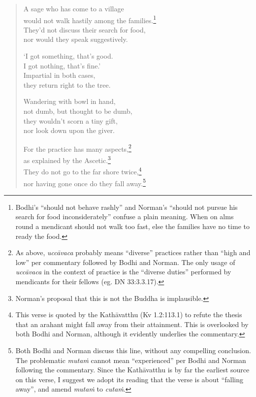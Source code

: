 \documentclass[12pt,openany]{book}%
\begin{document}
\begin{verse}
A sage who has come to a village \\
would not walk hastily among the families.\footnote{Bodhi’s “should not behave rashly” and Norman’s “should not pursue his search for food inconsiderately” confuse a plain meaning. When on alms round a mendicant should not walk too fast, else the families have no time to ready the food. } \\
They’d not discuss their search for food, \\
nor would they speak suggestively. 

‘I got something, that’s good. \\
I got nothing, that’s fine.’ \\
Impartial in both cases, \\
they return right to the tree. 

Wandering with bowl in hand, \\
not dumb, but thought to be dumb, \\
they wouldn’t scorn a tiny gift, \\
nor look down upon the giver. 

For the practice has many aspects,\footnote{As above, \textit{\textsanskrit{uccāvaca}} probably means “diverse” practices rather than “high and low” per commentary followed by Bodhi and Norman. The only usage of \textit{\textsanskrit{uccāvaca}} in the context of practice is the “diverse duties” performed by mendicants for their fellows (eg. DN 33:3.3.17). } \\
as explained by the Ascetic.\footnote{Norman’s proposal that this is not the Buddha is implausible. } \\
They do not go to the far shore twice,\footnote{This verse is quoted by the \textsanskrit{Kathāvatthu} (Kv 1.2:113.1) to refute the thesis that an arahant might fall away from their attainment. This is overlooked by both Bodhi and Norman, although it evidently underlies the commentary. } \\
nor having gone once do they fall away.\footnote{Both Bodhi and Norman discuss this line, without any compelling conclusion. The problematic \textit{\textsanskrit{mutaṁ}} cannot mean “experienced” per Bodhi and Norman following the commentary. Since the \textsanskrit{Kathāvatthu} is by far the earliest source on this verse, I suggest we adopt its reading that the verse is about “falling away”, and amend \textit{\textsanskrit{mutaṁ}} to \textit{\textsanskrit{cutaṁ}}. } 


\end{verse}
\end{document}
